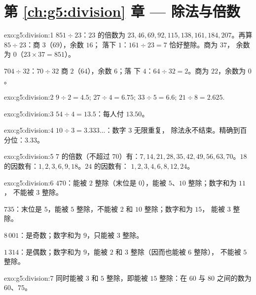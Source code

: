 \section*{第 \ref{ch:g5:division} 章 --- 除法与倍数}

\begin{solution}{exo:g5:division:1}
$851 \div 23$：$23$ 的倍数为 $23, 46, 69, 92, 115, 138, 161,
184, 207$。再算 $85 \div 23$：商 $3$（$69$），余数 $16$；
落下 $1$：$161 \div 23 = 7$ 恰好整除。商为 $37$，
余数为 $0$（$23 \times 37 = 851$）。

$704 \div 32$：$70 \div 32$ 商 $2$（$64$），余数 $6$；落
下 $4$：$64 \div 32 = 2$。商为 $22$，余数为 $0$。
\end{solution}

\begin{solution}{exo:g5:division:2}
$9 \div 2 = 4.5$; \quad $27 \div 4 = 6.75$; \quad
$33 \div 5 = 6.6$; \quad $21 \div 8 = 2.625$.
\end{solution}

\begin{solution}{exo:g5:division:3}
$54 \div 4 = 13.5$：每人付 $13.50$。
\end{solution}

\begin{solution}{exo:g5:division:4}
$10 \div 3 = 3.333\dots$：数字 $3$ 无限重复，
除法永不结束。精确到百分位：$3.33$。
\end{solution}

\begin{solution}{exo:g5:division:5}
$7$ 的倍数（不超过 $70$）有：$7, 14, 21, 28, 35, 42, 49, 56, 63,
70$。$18$ 的因数有：$1, 2, 3, 6, 9, 18$。$24$ 的因数有：
$1, 2, 3, 4, 6, 8, 12, 24$。
\end{solution}

\begin{solution}{exo:g5:division:6}
$470$：能被 $2$ 整除（末位是 $0$），能被 $5$、$10$ 整除；数字和为 $11$，
不能被 $3$ 整除。

$735$：末位是 $5$，能被 $5$ 整除，不能被 $2$ 和 $10$ 整除；数字和为 $15$，
能被 $3$ 整除。

$8\,001$：是奇数；数字和为 $9$，只能被 $3$ 整除。

$1\,314$：是偶数；数字和为 $9$，能被 $2$ 和 $3$ 整除（因而也能被 $6$ 整除），
不能被 $5$ 整除。
\end{solution}

\begin{solution}{exo:g5:division:7}
同时能被 $3$ 和 $5$ 整除，即能被 $15$ 整除：在 $60$ 与
$80$ 之间的数为 $60$、$75$。
\end{solution}

